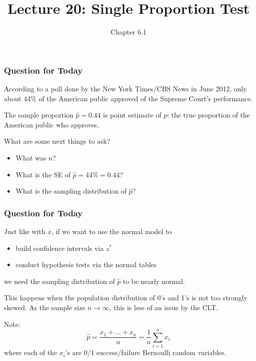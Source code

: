 \documentclass[handout]{beamer}
\title{Lecture 20: Single Proportion Test}
\author{Chapter 6.1}
\date{}
\newcommand{\blue}[1]{\textcolor{blue2}{#1}}
\newcommand{\xbar}{\overline{x}}
\newcommand{\phat}{\widehat{p}}
\begin{document}
\begin{frame}
\titlepage
\end{frame}

\begin{frame}[fragile]
\frametitle{Question for Today}

According to a poll done by the New York Times/CBS News in June 2012, only about 44\% of the American public approved of the Supreme Court's performance.  

\vspace{0.25cm}

\pause The sample proportion $\phat=0.44$ is \blue{point estimate} of $p$: the true proportion of the American public who approves.  

\vspace{0.25cm}

\pause What are some next things to ask?

\vspace{0.25cm}

\pause\begin{itemize}
\item What was $n$?
\item What is the \blue{SE} of $\phat=44\%=0.44$?
\item What is the sampling distribution of $\phat$?
\end{itemize}

\end{frame}


\begin{frame}[fragile]
\frametitle{Question for Today}

Just like with $\xbar$, if we want to use the normal model to
\begin{itemize}
\item build confidence intervals via $z^*$
\item conduct hypothesis tests via the normal tables
\end{itemize}
we need the \blue{sampling distribution} of $\phat$ to be nearly normal.  

\vspace{0.25cm}
\pause This happens when the population distribution of 0's and 1's is not too strongly skewed.  As the sample size $n \longrightarrow \infty$, this is less of an issue by the CLT. 

%
%
\vspace{0.25cm}
\pause Note:  \[
\phat = \frac{x_1 + \ldots + x_n}{n} = \frac{1}{n}\sum_{i=1}^{n}x_i
\]
where each of the $x_i$'s are 0/1 success/failure \blue{Bernoulli} random variables.  
\end{frame}
\end{document}
